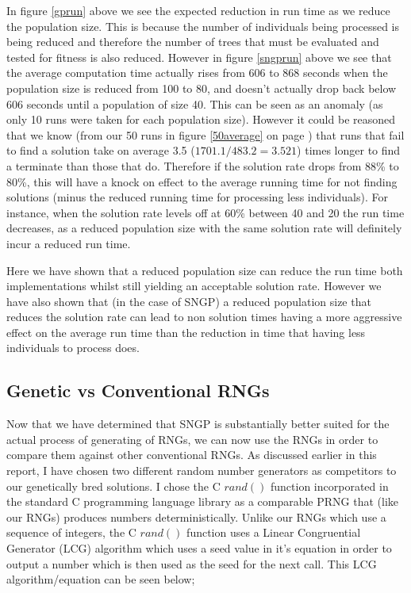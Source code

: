 \documentclass[a4paper,10.5pt]{article}
\begin{document}
In figure \ref{gprun} above we see the expected reduction in run time as we reduce the population size. This is because the number of individuals being processed is being reduced and therefore the number of trees that must be evaluated and tested for fitness is also reduced. However in figure \ref{sngprun} above we see that the average computation time actually rises from 606 to 868 seconds when the population size is reduced from 100 to 80, and doesn't actually drop back below 606 seconds until a population of size 40. This can be seen as an anomaly (as only 10 runs were taken for each population size). However it could be reasoned that we know (from our 50 runs in figure \ref{50average} on page \pageref{50average}) that runs that fail to find a solution take on average 3.5 ($1701.1 / 483.2 = 3.521$) times longer to find a terminate than those that do. Therefore if the solution rate drops from 88\% to 80\%, this will have a knock on effect to the average running time for not finding solutions (minus the reduced running time for processing less individuals). For instance, when the solution rate levels off at 60\% between 40 and 20 the run time decreases, as a reduced population size with the same solution rate will definitely incur a reduced run time.

Here we have shown that a reduced population size can reduce the run time both implementations whilst still yielding an acceptable solution rate. However we have also shown that (in the case of SNGP) a reduced population size that reduces the solution rate can lead to non solution times having a more aggressive effect on the average run time than the reduction in time that having less individuals to process does.

\subsection{Genetic vs Conventional RNGs}

Now that we have determined that SNGP is substantially better suited for the actual process of generating of RNGs, we can now use the RNGs in order to compare them against other conventional RNGs. As discussed earlier in this report, I have chosen two different random number generators as competitors to our genetically bred solutions. I chose the C $rand()$ function incorporated in the standard C programming language library as a comparable PRNG that (like our RNGs) produces numbers deterministically. Unlike our RNGs which use a sequence of integers, the C $rand()$ function uses a Linear Congruential Generator (LCG) algorithm which uses a seed value in it's equation in order to output a number which is then used as the seed for the next call. This LCG algorithm/equation can be seen below;
\end{document}
